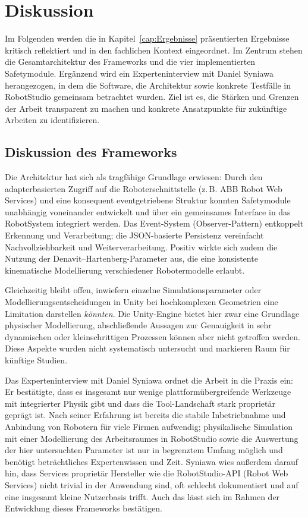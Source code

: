 \chapter{Diskussion}
\label{cap:diskussion}
Im Folgenden werden die in
Kapitel~\ref{cap:Ergebnisse} präsentierten
Ergebnisse kritisch reflektiert und in den fachlichen Kontext eingeordnet. Im
Zentrum stehen die Gesamtarchitektur des Frameworks und die vier implementierten
Safetymodule. Ergänzend wird ein Experteninterview mit Daniel Syniawa
herangezogen, in dem die Software, die Architektur sowie konkrete Testfälle in
RobotStudio gemeinsam betrachtet wurden. Ziel ist es, die Stärken und Grenzen
der Arbeit transparent zu machen und konkrete Ansatzpunkte für zukünftige
Arbeiten zu identifizieren.

\section{Diskussion des Frameworks}

Die Architektur hat sich als tragfähige Grundlage erwiesen: Durch den
adapterbasierten Zugriff auf die Roboterschnittstelle (z.\,B. ABB Robot Web
Services) und eine konsequent eventgetriebene Struktur konnten
Safetymodule unabhängig voneinander entwickelt und über ein gemeinsames
Interface in das RobotSystem integriert werden. Das Event-System
(Observer-Pattern) entkoppelt Erkennung und Verarbeitung; die JSON-basierte
Persistenz vereinfacht Nachvollziehbarkeit und Weiterverarbeitung. Positiv
wirkte sich zudem die Nutzung der Denavit–Hartenberg-Parameter aus, die eine
konsistente kinematische Modellierung verschiedener Robotermodelle erlaubt.

Gleichzeitig bleibt offen, inwiefern einzelne Simulationsparameter
oder Modellierungsentscheidungen in Unity bei hochkomplexen Geometrien eine
Limitation darstellen \emph{könnten}. Die Unity-Engine bietet hier zwar eine
Grundlage physischer Modellierung, abschließende Aussagen zur Genauigkeit in
sehr dynamischen oder kleinschrittigen Prozessen können aber nicht getroffen
werden. Diese Aspekte wurden nicht systematisch untersucht und markieren Raum
für künftige Studien.

Das Experteninterview mit Daniel Syniawa ordnet die Arbeit in die
Praxis ein: Er bestätigte, dass es insgesamt nur wenige plattformübergreifende
Werkzeuge mit integrierter Physik gibt und dass die Tool-Landschaft stark
proprietär geprägt ist. Nach seiner Erfahrung ist bereits die stabile
Inbetriebnahme und Anbindung von Robotern für viele Firmen aufwendig;
physikalische Simulation mit einer Modellierung des Arbeitsraumes in RobotStudio
sowie die Auswertung der hier untersuchten Parameter ist nur in begrenztem
Umfang möglich und benötigt beträchtliches Expertenwissen und Zeit. Syniawa wies
außerdem darauf hin, dass Services proprietär Hersteller wie die RobotStudio-API
(Robot Web Services) nicht trivial in der Anwendung sind, oft schlecht
dokumentiert und auf eine insgesamt kleine Nutzerbasis trifft. Auch das lässt
sich im Rahmen der Entwicklung dieses Frameworks bestätigen.

